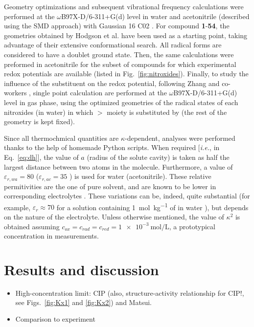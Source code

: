 \documentclass[review]{elsarticle}
\begin{document}
Geometry optimizations and subsequent vibrational frequency calculations were performed at the $\omega$B97X-D/6-311+G(d) level in water and acetonitrile (described using the SMD \cite{marenichUniversalSolvationModel2009} approach) with Gaussian 16 C02 \cite{g16}. For compound \textbf{1}-\textbf{54}, the geometries obtained by Hodgson et al. \cite{hodgsonOneElectronOxidationReduction2007} have been used as a starting point, taking advantage of their extensive conformational search. All radical forms are considered to have a doublet ground state. Then, the same calculations were preformed in acetonitrile for the subset of compounds for which experimental redox potentials are available (listed in Fig.~\ref{fig:nitroxides}). Finally, to study the influence of the substituent on the redox potential, following Zhang and co-workers \cite{zhangEffectHeteroatomFunctionality2018}, single point calculation are performed at the $\omega$B97X-D/6-311+G(d) level in gas phase, using the optimized geometries of  the radical states of each nitroxides (in water) in which $>$ moiety is substituted by  (the rest of the geometry is kept fixed).

Since all thermochmical quantities are $\kappa$-dependent, analyses were performed thanks to the help of homemade Python scripts. When required [\textit{i.e.}, in Eq.~\eqref{eq:dh}], the value of $a$ (radius of the solute cavity) is taken as half the largest distance between two atoms in the molecule. Furthermore, a value of $\varepsilon_{r,wa}=80$ ($\varepsilon_{r,ac}=35$ ) is used for water (acetonitrile). These relative permitivities are the one of pure solvent, and are known to be lower in corresponding electrolytes \cite{silvaTrueHuckelEquation2022}. These variations can be, indeed, quite substantial (for example, $\varepsilon_r\approx 70$ for a solution containing \SI{1}{\mol\per\kilo\gram} of  in water \cite{kontogeorgisDebyeHuckelTheoryIts2018,silvaTrueHuckelEquation2022}), but depends on the nature of the electrolyte.
Unless otherwise mentioned, the value of $\kappa^2$ is obtained assuming  $c_{ox} = c_{rad} = c_ {red} = \SI{1e-3}{\mole\per\liter}$, a prototypical concentration in measurements.

\clearpage

\section{Results and discussion}

\begin{itemize}
	\item High-concentration limit: CIP (also, structure-activity relationship for CIP!, see Figs.~\ref{fig:Kx1} and \ref{fig:Kx2}) and Matsui.
	\item Comparison to experiment
\end{itemize}
\end{document}
